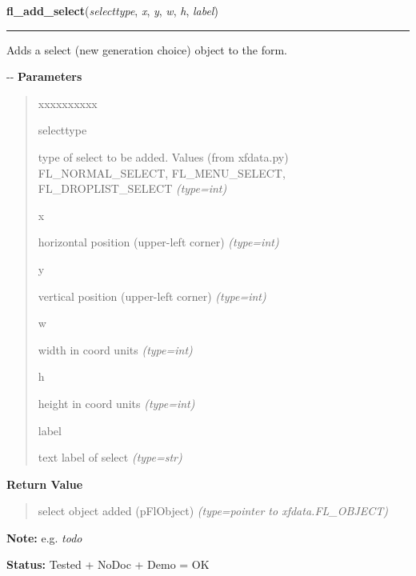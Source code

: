     \vspace{0.5ex}

\hspace{.8\funcindent}\begin{boxedminipage}{\funcwidth}

    \raggedright \textbf{fl\_add\_select}(\textit{selecttype}, \textit{x}, \textit{y}, \textit{w}, \textit{h}, \textit{label})

    \vspace{-1.5ex}

    \rule{\textwidth}{0.5\fboxrule}
\setlength{\parskip}{2ex}

Adds a select (new generation choice) object to the form.

-{}-
\setlength{\parskip}{1ex}
      \textbf{Parameters}
      \vspace{-1ex}

      \begin{quote}
        \begin{Ventry}{xxxxxxxxxx}

          \item[selecttype]


type of select to be added. Values (from xfdata.py) FL\_NORMAL\_SELECT,
FL\_MENU\_SELECT, FL\_DROPLIST\_SELECT
            {\it (type=int)}

          \item[x]


horizontal position (upper-left corner)
            {\it (type=int)}

          \item[y]


vertical position (upper-left corner)
            {\it (type=int)}

          \item[w]


width in coord units
            {\it (type=int)}

          \item[h]


height in coord units
            {\it (type=int)}

          \item[label]


text label of select
            {\it (type=str)}

        \end{Ventry}

      \end{quote}

      \textbf{Return Value}
    \vspace{-1ex}

      \begin{quote}

select object added (pFlObject)
      {\it (type=pointer to xfdata.FL\_OBJECT)}

      \end{quote}

\textbf{Note:} 
e.g. \emph{todo}


\textbf{Status:} 
Tested + NoDoc + Demo = OK


    \end{boxedminipage}

